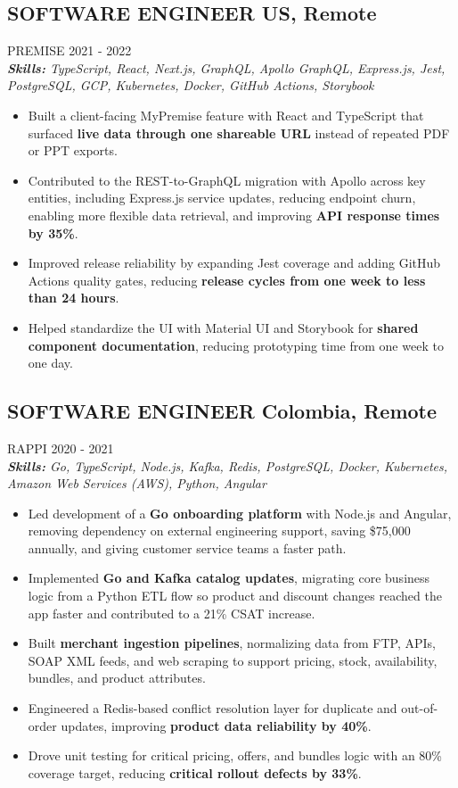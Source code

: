 \documentclass{article}
\newcommand{\WorkExperience}[2]{
   \subsection*{#1}
   \vspace{-1em}
   \uppercase{#2}
}
\newcommand{\Skills}[1]{
   \textit{\textbf{Skills:} #1}
}
\begin{document}
\WorkExperience{SOFTWARE ENGINEER \hfill US, Remote}{Premise \hfill 2021 {-} 2022} \\
\Skills{TypeScript, React, Next.js, GraphQL, Apollo GraphQL, Express.js, Jest, PostgreSQL, GCP, Kubernetes, Docker, GitHub Actions, Storybook}
\begin{itemize}
	\item Built a client-facing MyPremise feature with React and TypeScript that surfaced \textbf{live data through one shareable URL} instead of repeated PDF or PPT exports.
	\item Contributed to the REST-to-GraphQL migration with Apollo across key entities, including Express.js service updates, reducing endpoint churn, enabling more flexible data retrieval, and improving \textbf{API response times by 35\%}.
	\item Improved release reliability by expanding Jest coverage and adding GitHub Actions quality gates, reducing \textbf{release cycles from one week to less than 24 hours}.
	\item Helped standardize the UI with Material UI and Storybook for \textbf{shared component documentation}, reducing prototyping time from one week to one day.
\end{itemize}

\WorkExperience{SOFTWARE ENGINEER \hfill Colombia, Remote}{Rappi \hfill 2020 {-} 2021} \\
\Skills{Go, TypeScript, Node.js, Kafka, Redis, PostgreSQL, Docker, Kubernetes, Amazon Web Services (AWS), Python, Angular}
\begin{itemize}
	\item Led development of a \textbf{Go onboarding platform} with Node.js and Angular, removing dependency on external engineering support, saving \$75,000 annually, and giving customer service teams a faster path.
	\item Implemented \textbf{Go and Kafka catalog updates}, migrating core business logic from a Python ETL flow so product and discount changes reached the app faster and contributed to a 21\% CSAT increase.
	\item Built \textbf{merchant ingestion pipelines}, normalizing data from FTP, APIs, SOAP XML feeds, and web scraping to support pricing, stock, availability, bundles, and product attributes.
	\item Engineered a Redis-based conflict resolution layer for duplicate and out-of-order updates, improving \textbf{product data reliability by 40\%}.
	\item Drove unit testing for critical pricing, offers, and bundles logic with an 80\% coverage target, reducing \textbf{critical rollout defects by 33\%}.
\end{itemize}
\end{document}
